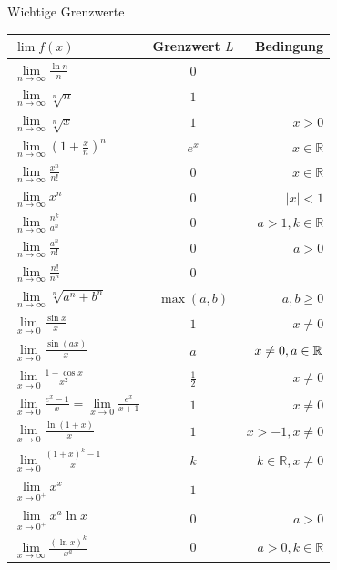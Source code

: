 \begin{minipage}{\linewidth}
\Tab Wichtige Grenzwerte

\begin{tabular}{l c r}
    $\lim f(x)$ & Grenzwert $L$ & Bedingung \\
    \hline
    $\lim\limits_{n\to\infty} \frac{\ln n}{n}$ & $0$ & \\[1ex]
    $\lim\limits_{n\to\infty} \sqrt[n]{n}$ & $1$ & \\[1ex]
    $\lim\limits_{n\to\infty} \sqrt[n]{x}$ & $1$ & $x > 0$ \\[1ex]
    $\lim\limits_{n\to\infty} \left(1 + \frac{x}{n}\right)^n$ & $e^x$ & $x \in \mathbb{R}$ \\[1ex]
    $\lim\limits_{n\to\infty} \frac{x^n}{n!}$ & $0$ & $x \in \mathbb{R}$ \\[0.5ex]
    \hline
    $\lim\limits_{n\to\infty} x^n$ & $0$ & $|x| < 1$ \\[1ex]
    $\lim\limits_{n\to\infty} \frac{n^k}{a^n}$ & $0$ & $a > 1, k \in \mathbb{R}$ \\[1ex]
    $\lim\limits_{n\to\infty} \frac{a^n}{n!}$ & $0$ & $a > 0$ \\[1ex]
    $\lim\limits_{n\to\infty} \frac{n!}{n^n}$ & $0$ & \\[1ex]
    $\lim\limits_{n\to\infty} \sqrt[n]{a^n + b^n}$ & $\max(a, b)$ & $a, b \ge 0$ \\
    \hline
    $\lim\limits_{x\to 0} \frac{\sin x}{x}$ & $1$ & $x \neq 0$ \\[1ex]
    $\lim\limits_{x\to 0} \frac{\sin (ax)}{x}$ & $a$ & $x \neq 0, a \in \mathbb{R}$ \\[1ex]
    $\lim\limits_{x\to 0} \frac{1 - \cos x}{x^2}$ & $\frac{1}{2}$ & $x \neq 0$ \\[1ex]
    $\lim\limits_{x\to 0} \frac{e^x - 1}{x} = \lim\limits_{x\to 0} \frac{e^x}{x + 1}$ & $1$ & $x \neq 0$ \\[1ex]
    $\lim\limits_{x\to 0} \frac{\ln(1 + x)}{x}$ & $1$ & $x > -1, x \neq 0$ \\[1ex]
    $\lim\limits_{x\to 0} \frac{(1 + x)^k - 1}{x}$ & $k$ & $k \in \mathbb{R}, x \neq 0$ \\[0.5ex]
    \hline
    $\lim\limits_{x\to 0^+} x^x$ & $1$ & \\[1ex]
    $\lim\limits_{x\to 0^+} x^a \ln x$ & $0$ & $a > 0$ \\[1ex]
    $\lim\limits_{x\to\infty} \frac{(\ln x)^k}{x^a}$ & $0$ & $a > 0, k \in \mathbb{R}$
\end{tabular}
\end{minipage}

